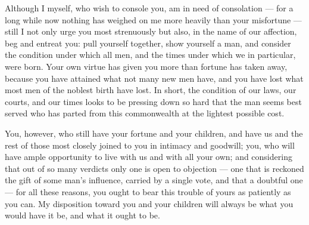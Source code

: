 

 Although I myself, who wish to console you, am in need of consolation --- for a long while now nothing has weighed on me more heavily than your misfortune --- still I not only urge you most strenuously but also, in the name of our affection, beg and entreat you: pull yourself together, show yourself a man, and consider the condition under which all men, and the times under which we in particular, were born. Your own virtue has given you more than fortune has taken away, because you have attained what not many new men have, and you have lost what most men of the noblest birth have lost. In short, the condition of our laws, our courts, and our times looks to be pressing down so hard that the man seems best served who has parted from this commonwealth at the lightest possible cost.

 You, however, who still have your fortune and your children, and have us and the rest of those most closely joined to you in intimacy and goodwill; you, who will have ample opportunity to live with us and with all your own; and considering that out of so many verdicts only one is open to objection --- one that is reckoned the gift of some man's influence, carried by a single vote, and that a doubtful one --- for all these reasons, you ought to bear this trouble of yours as patiently as you can. My disposition toward you and your children will always be what you would have it be, and what it ought to be.
